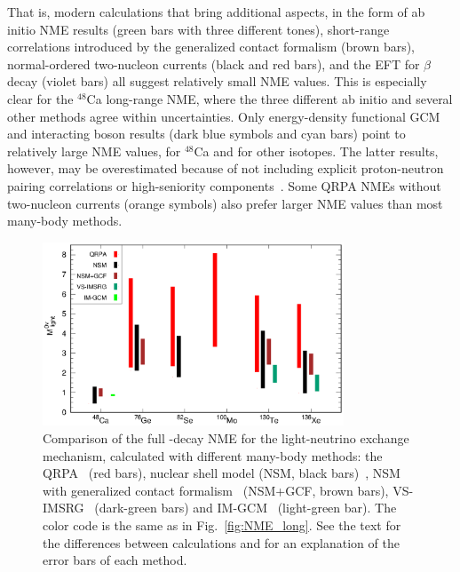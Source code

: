 That is, modern calculations that bring additional aspects, in the form of ab initio NME results (green bars with three different tones), short-range correlations introduced by the generalized contact formalism (brown bars), normal-ordered two-nucleon currents (black and red bars), and the EFT for $\beta$ decay (violet bars) all suggest relatively small NME values. This is especially clear for the $^{48}$Ca long-range NME, where the three different ab initio and several other methods agree within uncertainties. Only energy-density functional GCM and interacting boson results (dark blue symbols and cyan bars) point to relatively large NME values, for $^{48}$Ca and for other isotopes. The latter results, however, may be overestimated because of not including explicit proton-neutron pairing correlations or high-seniority components~\cite{Menendez:2014ena,Hinohara:2014lqa,Menendez:2015kxa}. Some QRPA NMEs without two-nucleon currents (orange symbols) also prefer larger NME values than most many-body methods. 

\begin{figure}[t]
	\begin{center}
	\includegraphics[width=0.8\textwidth]{img/nme_total_2023.eps}
	\caption{Comparison of the full \bbonu-decay NME for the light-neutrino exchange mechanism, calculated with different many-body methods: the QRPA~\cite{Jokiniemi:2022ayc} (red bars), nuclear shell model (NSM, black bars)~\cite{Jokiniemi:2022ayc}, NSM with generalized contact formalism~\cite{Weiss:2021rig} (NSM+GCF, brown bars), VS-IMSRG~\cite{Belley:2023btr} (dark-green bars) and IM-GCM~\cite{Wirth:2021pij} (light-green bar). The color code is the same as in Fig.~\ref{fig:NME_long}. See the text for the differences between calculations and for an explanation of the error bars of each method.\label{fig:NME_full}
	}
\end{center}
\end{figure}

